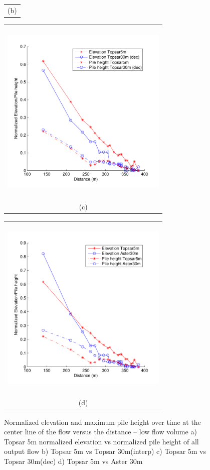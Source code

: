 \documentclass[12pt,letterpaper]{article}
\begin{document}
\begin{figure}[H]
\begin{minipage}{0.5\textwidth}
\begin{tabular}{c}
      (b)
    \end{tabular}
  \end{minipage}
  \begin{minipage}[b]{0.5\textwidth}
    \begin{tabular}{c}
      \includegraphics[width=8cm,height=9cm,keepaspectratio]{plots/low_T5_T30_3.pdf}\\
      (c)
    \end{tabular}
  \end{minipage}
  \begin{minipage}{0.5\textwidth}
    \begin{tabular}{c}
      \includegraphics[width=8cm,height=9cm,keepaspectratio]{plots/low_T5_A30.pdf}\\
      (d)
    \end{tabular}
  \end{minipage}
  \caption{Normalized elevation and maximum pile height over time at the center line of the flow versus the distance -- low flow volume a) Topsar 5m normalized elevation vs normalized pile height of all output flow b) Topsar 5m vs Topsar 30m(interp) c) Topsar 5m vs Topsar 30m(dec) d) Topsar 5m vs Aster 30m }\label{fig10}
\end{figure}
\end{document}
